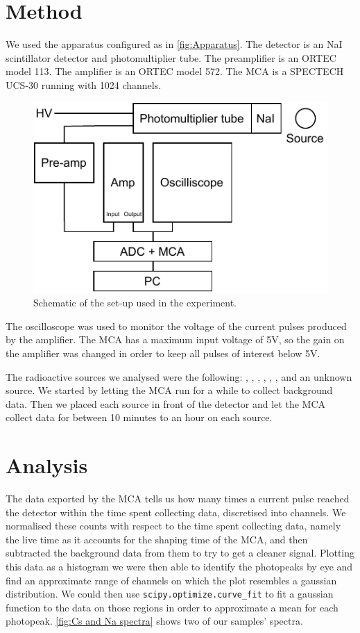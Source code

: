 \documentclass[11pt]{article}
\numberwithin{equation}{section}
\numberwithin{figure}{section}
\numberwithin{table}{section}
\begin{document}
    \section{Method}\label{sec:Method}
    \par We used the apparatus configured as in \autoref{fig:Apparatus}. The detector is an NaI scintillator detector and photomultiplier tube. The preamplifier is an ORTEC model 113. The amplifier is an ORTEC model 572. The MCA is a SPECTECH UCS-30 running with 1024 channels. 
    \begin{figure}
        \includegraphics{apparatus.pdf}
        \caption{Schematic of the set-up used in the experiment.}
        \label{fig:Apparatus}
    \end{figure}
    \par The oscilloscope was used to monitor the voltage of the current pulses produced by the amplifier. The MCA has a maximum input voltage of 5V, so the gain on the amplifier was changed in order to keep all pulses of interest below 5V. 
    \par The radioactive sources we analysed were the following: , , , , , , and an unknown source. We started by letting the MCA run for a while to collect background data. Then we placed each source in front of the detector and let the MCA collect data for between 10 minutes to an hour on each source. 

    \section{Analysis}\label{sec:Analysis}
    \par The data exported by the MCA tells us how many times a current pulse reached the detector within the time spent collecting data, discretised into channels. We normalised these counts with respect to the time spent collecting data, namely the live time as it accounts for the shaping time of the MCA, and then subtracted the background data from them to try to get a cleaner signal. Plotting this data as a histogram we were then able to identify the photopeaks by eye and find an approximate range of channels on which the plot resembles a gaussian distribution. We could then use \texttt{scipy.optimize.curve\_fit} to fit a gaussian function to the data on those regions in order to approximate a mean for each photopeak. \autoref{fig:Cs and Na spectra} shows two of our samples' spectra. 
\end{document}
